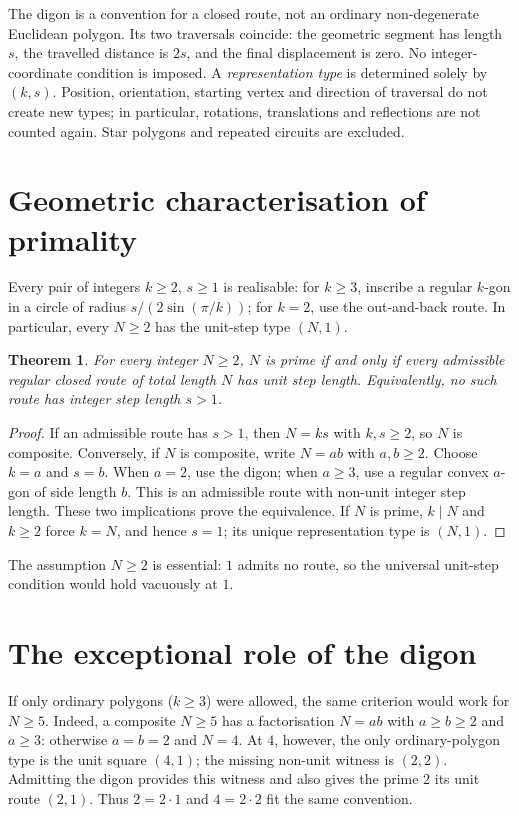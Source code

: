 \documentclass[11pt,a4paper]{article}
\newtheorem{theorem}{Theorem}
\theoremstyle{definition}
\begin{document}
The digon is a convention for a closed route, not an ordinary
non-degenerate Euclidean polygon. Its two traversals coincide: the
geometric segment has length $s$, the travelled distance is $2s$, and
the final displacement is zero. No integer-coordinate condition is imposed.
A \emph{representation type} is determined solely by $(k,s)$.
Position, orientation, starting vertex and direction of traversal do not
create new types; in particular, rotations, translations and reflections
are not counted again. Star polygons and repeated circuits are excluded.

\newpage
\section{Geometric characterisation of primality}
Every pair of integers $k\ge2$, $s\ge1$ is realisable: for $k\ge3$,
inscribe a regular $k$-gon in a circle of radius
$s/(2\sin(\pi/k))$; for $k=2$, use the out-and-back route.
In particular, every $N\ge2$ has the unit-step type $(N,1)$.

\begin{theorem}\label{thm:prime}
For every integer $N\ge2$, $N$ is prime if and only if every admissible
regular closed route of total length $N$ has unit step length.
Equivalently, no such route has integer step length $s>1$.
\end{theorem}
\begin{proof}
If an admissible route has $s>1$, then $N=ks$ with $k,s\ge2$,
so $N$ is composite. Conversely, if $N$ is composite, write $N=ab$
with $a,b\ge2$. Choose $k=a$ and $s=b$. When $a=2$, use the digon;
when $a\ge3$, use a regular convex $a$-gon of side length $b$.
This is an admissible route with non-unit integer step length.
These two implications prove the equivalence. If $N$ is prime,
$k\mid N$ and $k\ge2$ force $k=N$, and hence $s=1$; its unique
representation type is $(N,1)$.
\end{proof}

The assumption $N\ge2$ is essential: $1$ admits no route, so the
universal unit-step condition would hold vacuously at $1$.

\section{The exceptional role of the digon}
If only ordinary polygons ($k\ge3$) were allowed, the same criterion
would work for $N\ge5$. Indeed, a composite $N\ge5$ has a factorisation
$N=ab$ with $a\ge b\ge2$ and $a\ge3$: otherwise $a=b=2$ and $N=4$.
At $4$, however, the only ordinary-polygon type is the unit square
$(4,1)$; the missing non-unit witness is $(2,2)$. Admitting the digon
provides this witness and also gives the prime $2$ its unit route $(2,1)$.
Thus $2=2\cdot1$ and $4=2\cdot2$ fit the same convention.
\end{document}
